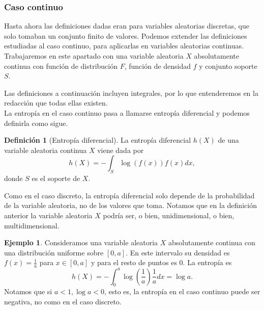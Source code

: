 \documentclass[10pt,a4paper]{article} %
\theoremstyle{definition}
\newtheorem{definition}{Definición}[section]
\newtheorem{example}[theorem]{Ejemplo}
\begin{document}
\subsubsection{Caso continuo}
Hasta ahora las definiciones dadas eran para variables aleatorias discretas, que solo tomaban un conjunto finito de valores. Podemos extender las definiciones estudiadas al caso continuo, para aplicarlas en variables aleatorias continuas. Trabajaremos en este apartado con una variable aleatoria $X$ absolutamente continua con función de distribución $F$, función de densidad $f$ y conjunto soporte $S$.

Las definiciones a continuación incluyen integrales, por lo que entenderemos en la redacción que todas ellas existen.\\


La entropía en el caso continuo pasa a llamarse entropía diferencial y podemos definirla como sigue.

\begin{definition}[Entropía diferencial]
  La entropía diferencial $h(X)$ de una variable aleatoria continua $X$ viene dada por \[
h(X) = - \int_S\log \left(f(x)\right) f(x) dx,
\]
donde $S$ es el soporte de $X$.
\end{definition}
Como en el caso discreto, la entropía diferencial solo depende de la probabilidad de la variable aleatoria, no de los valores que toma. Notamos que en la definición anterior la variable aleatoria $X$ podría ser, o bien, unidimensional, o bien, multidimensional.

\begin{example}\label{ej:uni} Consideramos una variable aleatoria $X$ absolutamente continua con una distribución uniforme sobre $[0,a]$. En este intervalo su densidad es $f(x) = \frac{1}{a}$ para $x\in[0,a]$ y para el resto de puntos es 0. La entropía es \[
h(X) = - \int_0^a\log\left(\frac{1}{a}\right)\frac{1}{a}dx = \log a.
  \]
Notamos que si $a<1, \log a < 0$, esto es, la entropía en el caso continuo puede ser negativa, no como en el caso discreto.\\
\end{example}
\end{document}
